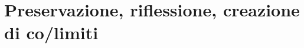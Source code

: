 \section{Preservazione, riflessione, creazione di co/limiti}
\begin{esercizi}
\item \item \item \item \item 
\end{esercizi}
